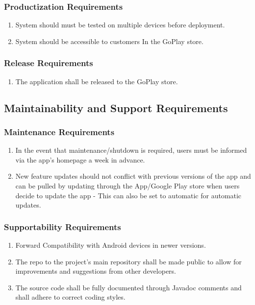 \documentclass[]{article}
\begin{document}
\subsubsection{Productization Requirements}
\label{ssub:productization_requirements}
\begin{enumerate}[{OE-P}1. ]
	\item System should must be tested on multiple devices before deployment.
	\item System should be accessible to customers In the GoPlay store.
\end{enumerate}

\subsubsection{Release Requirements}
\label{ssub:release_requirements}
\begin{enumerate}[{OE-R}1. ]
	\item The application shall be released to the GoPlay store.
\end{enumerate}


\subsection{Maintainability and Support Requirements}
\label{sub:maintainability_and_support_requirements}

\subsubsection{Maintenance Requirements}
\label{ssub:maintenance_requirements}
\begin{enumerate}[{MS-M}1. ]
	\item In the event that maintenance/shutdown is required, users must be informed via the app’s homepage a week in advance.
	\item New feature updates should not conflict with previous versions of the app and can be pulled by updating through the App/Google Play store when users decide to update the app - This can also be set to automatic for automatic updates.
\end{enumerate}

\subsubsection{Supportability Requirements}
\label{ssub:supportability_requirements}
\begin{enumerate}[{MS-S}1. ]
	\item Forward Compatibility with Android devices in newer versions.
	\item The repo to the project’s main repository shall be made public to allow for improvements and suggestions from other developers.
	\item The source code shall be fully documented through Javadoc comments and shall adhere to correct coding styles.
\end{enumerate}
\end{document}
